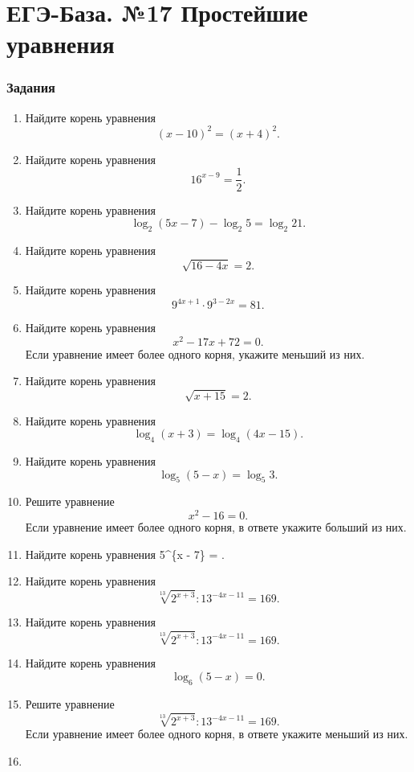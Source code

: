 \section{ЕГЭ-База. №17 Простейшие
уравнения}\label{ux435ux433ux44d-ux431ux430ux437ux430.-17-ux43fux440ux43eux441ux442ux435ux439ux448ux438ux435-ux443ux440ux430ux432ux43dux435ux43dux438ux44f}

\subsubsection{Задания}\label{ux437ux430ux434ux430ux43dux438ux44f}

\begin{enumerate}
\def\labelenumi{\arabic{enumi}.}
\tightlist
\item
  Найдите корень уравнения \[(x - 10)^2 = (x + 4)^2.\]
\item
  Найдите корень уравнения \[16^{x - 9} = \frac{1}{2}.\]
\item
  Найдите корень уравнения
  \[\log_{2}(5x - 7) - \log_{2}5 = \log_{2}21.\]
\item
  Найдите корень уравнения \[\sqrt{16 - 4x} = 2.\]
\item
  Найдите корень уравнения \[9^{4x + 1} \cdot 9^{3 - 2x} = 81.\]
\item
  Найдите корень уравнения \[x^2 - 17x + 72 = 0.\] Если уравнение имеет
  более одного корня, укажите меньший из них.
\item
  Найдите корень уравнения \[\sqrt{x + 15} = 2.\]
\item
  Найдите корень уравнения \[\log_{4}(x + 3) = \log_{4}(4x - 15).\]
\item
  Найдите корень уравнения \[\log_{5}(5 - x) = \log_{5}3.\]
\item
  Решите уравнение \[x^2 - 16 = 0.\] Если уравнение имеет более одного
  корня, в ответе укажите больший из них.
\item
  Найдите корень уравнения 5\^{}\{x - 7\} = .
\item
  Найдите корень уравнения \[\sqrt[13]{2^{x + 3}}:13^{-4x - 11} = 169.\]
\item
  Найдите корень уравнения \[\sqrt[13]{2^{x + 3}}:13^{-4x - 11} = 169.\]
\item
  Найдите корень уравнения \[\log_{6}(5 - x) = 0.\]
\item
  Решите уравнение \[\sqrt[13]{2^{x + 3}}:13^{-4x - 11} = 169.\] Если
  уравнение имеет более одного корня, в ответе укажите меньший из них.
\item

\end{enumerate}
